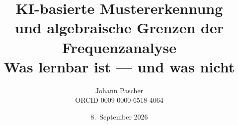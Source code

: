 \documentclass[11pt,a4paper]{report}
\title{KI-basierte Mustererkennung\\und algebraische Grenzen der Frequenzanalyse\\[0.5em]
  \large Was lernbar ist --- und was nicht}
\date{8.~September 2026}
\author{Johann Pascher\\\small ORCID 0009-0000-6518-4064}
\begin{document}
\renewcommand{\thechapter}{}
\renewcommand{\thesection}{\arabic{section}}
\maketitle
\tableofcontents

\end{document}
